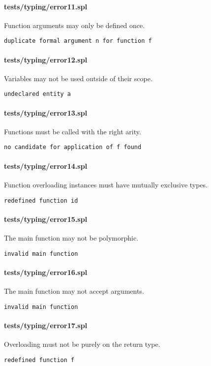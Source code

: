 \documentclass[a4paper]{article}
\begin{document}
\paragraph{tests/typing/error11.spl}
Function arguments may only be defined once.
    \begin{verbatim}
duplicate formal argument n for function f\end{verbatim}

\paragraph{tests/typing/error12.spl}
Variables may not be used outside of their scope.
    \begin{verbatim}
undeclared entity a\end{verbatim}

\paragraph{tests/typing/error13.spl}
Functions must be called with the right arity.
    \begin{verbatim}
no candidate for application of f found\end{verbatim}

\paragraph{tests/typing/error14.spl}
Function overloading instances must have mutually exclusive types.
    \begin{verbatim}
redefined function id\end{verbatim}

\paragraph{tests/typing/error15.spl}
The main function may not be polymorphic.
    \begin{verbatim}
invalid main function\end{verbatim}

\paragraph{tests/typing/error16.spl}
The main function may not accept arguments.
    \begin{verbatim}
invalid main function\end{verbatim}

\paragraph{tests/typing/error17.spl}
Overloading must not be purely on the return type.
    \begin{verbatim}
redefined function f\end{verbatim}
\end{document}
